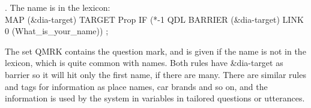 \documentclass[11pt]{article}
\begin{document}
\ex.\flushleft\label{namelex} \small{The name is in the lexicon: \\
MAP (\&dia-target) TARGET Prop IF (*-1 QDL BARRIER (\&dia-target) LINK 0 (What\_is\_your\_name)) ;}

The set QMRK contains the question mark, and is given if the name is not in the lexicon, which is quite common with names. Both rules have \&dia-target as barrier so it will hit only the first name, if there are many. There are similar rules and tags for information as place names, car brands and so on, and the information is used by the system in variables in tailored questions or utterances.




 



 
\end{document}
